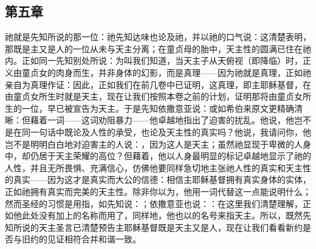 
\subsection{第五章}

\par

祂就是先知所说的那一位：祂先知达味也论及祂，并以祂的口气说：这清楚表明，那既是主又是人的一位从未与天主分离；在童贞母的胎中，天主性的圆满已住在祂内。正如同一先知别处所说：为叫我们知道，当天主子从天俯视（即降临）时，正义由童贞女的肉身而生，并非身体的幻影，而是真理——因为祂就是真理，正如祂亲自为真理作证：因此，正如我们在前几卷中已证明，这真理，即主耶稣基督，在由童贞女所生时就是天主，现在让我们按照本卷之前的计划，证明那将由童贞女所生的一位，早已被宣告为天主。于是先知依撒意亚说：或如希伯来原文更精确清晰：但藉着一词——这词劝阻暴力——他卓越地指出了迫害的扰乱。他说，他岂不是在同一句话中既论及人性的承受，也论及天主性的真实吗？他说，我请问你，他岂不是明明白白地对迫害主的人说：，因为这人是天主；虽然祂显现于卑微的人身中，却仍居于天主荣耀的高位？但藉着，他以人身最明显的标记卓越地显示了祂的人性，并且无所畏惧、充满信心，仿佛他要同样急切地主张祂人性的真实和天主性的真实——因为这才是真实而大公的信德：相信主耶稣基督拥有真实身体的实体，正如祂拥有真实而完美的天主性。除非你以为，他用一词代替这一点能说明什么；然而圣经的习惯是用指，如先知说：；依撒意亚也说：：在这里我们清楚理解，正如他此处没有加上的名称而用了，同样地，他也以的名号来指天主。所以，既然先知所说的天主圣言已清楚预告主耶稣基督既是天主又是人，现在让我们看看新约是否与旧约的见证相符合并和谐一致。\par

